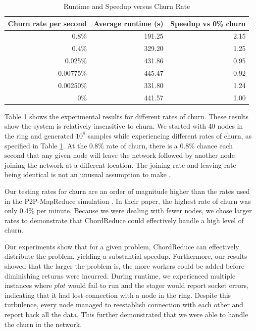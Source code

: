 \begin{table}
    \centering
    \begin{tabular}{|r|r|r|} 
        \hline 
        Churn rate per second & Average runtime (s) & Speedup vs 0\% churn\\ \hline{}
        0.8\% & 191.25 & 2.15 \\ \hline
        0.4\% & 329.20 & 1.25 \\ \hline
        0.025\% & 431.86 & 0.95 \\ \hline 
        0.00775\%  & 445.47 & 0.92 \\ \hline 
        0.00250\% & 331.80  &  1.24 \\ \hline 
        0\% & 441.57 & 1.00 \\ \hline
    \end{tabular}
    \caption[Runtime and Speedup versus Churn Rate]{Runtime and Speedup versus Churn Rate} 
    \label{churnSpeed}
\end{table}


Table \ref{churnSpeed} shows the experimental results for different rates of churn. These results show the system  is relatively insensitive to churn.  We started with 40 nodes in the ring and generated $10^{8}$ samples while experiencing different rates of churn, as specified in Table \ref{churnSpeed}.  At the 0.8\% rate of churn, there is a 0.8\% chance each second that any given node will leave the network followed by another node joining the network at a different location. The joining rate and leaving rate being identical is not an unusual assumption to make \cite{marozzo2012p2p} \cite{load}.  

Our testing rates for churn are an order of magnitude higher than the rates used in the P2P-MapReduce simulation  \cite{marozzo2012p2p}.  In their paper, the highest rate of churn was only 0.4\% per minute. Because we were dealing with fewer nodes, we chose larger rates to demonstrate that ChordReduce could effectively handle a high level of churn.  


Our experiments show that for a given problem, ChordReduce can effectively distribute the problem, yielding a substantial speedup.  Furthermore, our results showed that the larger the problem is, the more workers could be added before diminishing returns were incurred.  During runtime, we experienced multiple instances where $plot$ would fail to run and the stager would report socket errors, indicating that it had lost connection with a node in the ring.  Despite this turbulence, every node managed to reestablish connection with each other and report back all the data.  This further demonstrated that we were able to handle the churn in the network.



